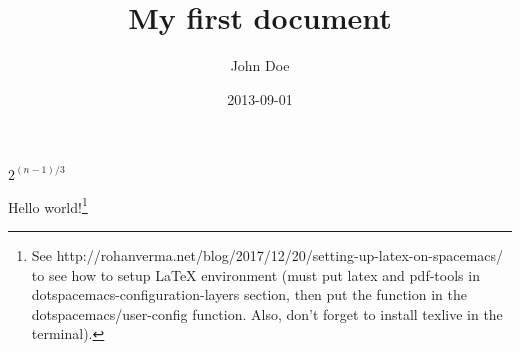 \documentclass{article}
\title{My first document}
\date{2013-09-01}
\author{John Doe}
\begin{document}
  \maketitle
  \newpage

  $2^{(n-1)/3}$

  Hello world!\footnote{See
  http://rohanverma.net/blog/2017/12/20/setting-up-latex-on-spacemacs/ to see
  how to setup LaTeX environment (must put latex and pdf-tools in
  dotspacemacs-configuration-layers section, then put the function in the
  dotspacemacs/user-config function. Also, don't forget to install texlive in
  the terminal).}
\end{document}
